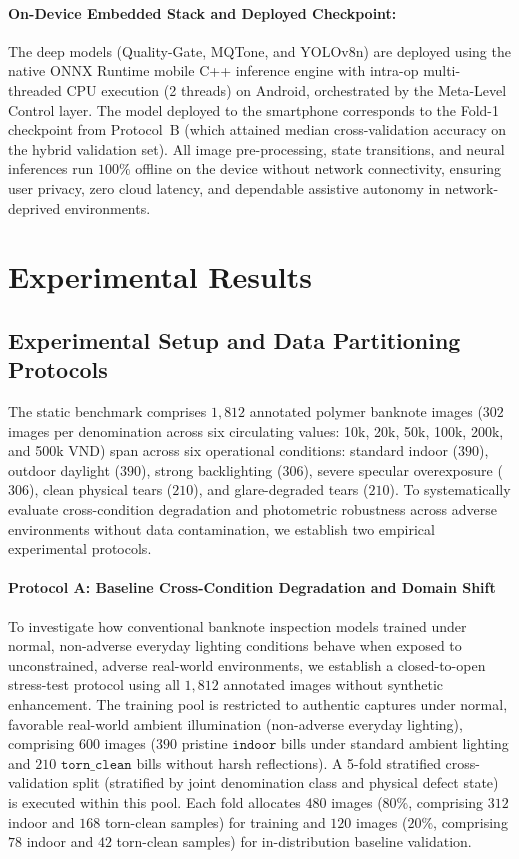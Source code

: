 \documentclass[final,5p,times,twocolumn,authoryear]{elsarticle}
\begin{document}
\paragraph{On-Device Embedded Stack and Deployed Checkpoint:}
The deep models (Quality-Gate, MQTone, and YOLOv8n) are deployed using the native ONNX Runtime mobile C++ inference engine with intra-op multi-threaded CPU execution (2 threads) on Android, orchestrated by the Meta-Level Control layer. The model deployed to the smartphone corresponds to the Fold-1 checkpoint from Protocol~B (which attained median cross-validation accuracy on the hybrid validation set). All image pre-processing, state transitions, and neural inferences run $100\%$ offline on the device without network connectivity, ensuring user privacy, zero cloud latency, and dependable assistive autonomy in network-deprived environments.

\section{Experimental Results}
\label{sec:experiments}
\subsection{Experimental Setup and Data Partitioning Protocols}
\label{subsec:exp_setup}

The static benchmark comprises $1{,}812$ annotated polymer banknote images ($302$ images per denomination across six circulating values: 10k, 20k, 50k, 100k, 200k, and 500k VND) span across six operational conditions: standard indoor ($390$), outdoor daylight ($390$), strong backlighting ($306$), severe specular overexposure ($306$), clean physical tears ($210$), and glare-degraded tears ($210$). To systematically evaluate cross-condition degradation and photometric robustness across adverse environments without data contamination, we establish two empirical experimental protocols.

\paragraph{Protocol A: Baseline Cross-Condition Degradation and Domain Shift}
To investigate how conventional banknote inspection models trained under normal, non-adverse everyday lighting conditions behave when exposed to unconstrained, adverse real-world environments, we establish a closed-to-open stress-test protocol using all $1{,}812$ annotated images without synthetic enhancement. The training pool is restricted to authentic captures under normal, favorable real-world ambient illumination (non-adverse everyday lighting), comprising $600$ images ($390$ pristine $\texttt{indoor}$ bills under standard ambient lighting and $210$ $\texttt{torn\_clean}$ bills without harsh reflections). A 5-fold stratified cross-validation split (stratified by joint denomination class and physical defect state) is executed within this pool. Each fold allocates $480$ images ($80\%$, comprising $312$ indoor and $168$ torn-clean samples) for training and $120$ images ($20\%$, comprising $78$ indoor and $42$ torn-clean samples) for in-distribution baseline validation.
\end{document}

